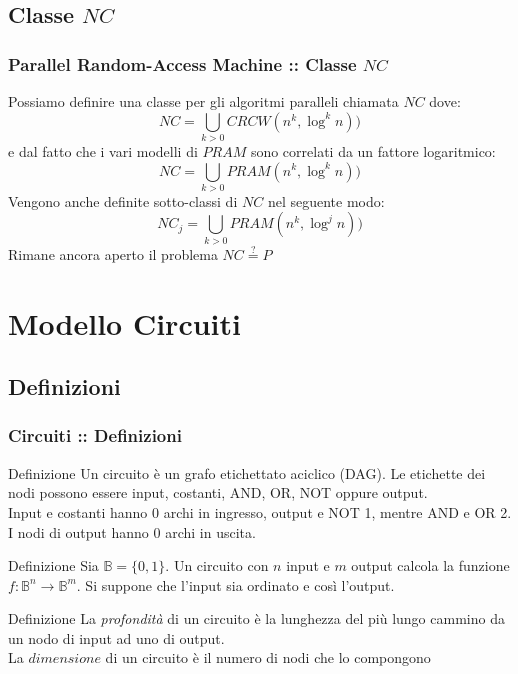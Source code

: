 \documentclass{beamer}
\begin{document}
\subsection{Classe $NC$}
\begin{frame}
	\frametitle{Parallel Random-Access Machine :: Classe $NC$} %
	Possiamo definire una classe per gli algoritmi paralleli chiamata $NC$ dove:
	\begin{equation}
		NC = \bigcup_{k>0} CRCW(n^k,\log^k n))
	\end{equation}
	e dal fatto che i vari modelli di $PRAM$ sono correlati da un fattore logaritmico: 
	\begin{equation}
		NC = \bigcup_{k>0} PRAM(n^k,\log^k n))
	\end{equation}
	Vengono anche definite sotto-classi di $NC$ nel seguente modo:
	\begin{equation}
		NC_j = \bigcup_{k>0} PRAM(n^k,\log^j n))
	\end{equation}
	Rimane ancora aperto il problema $NC \stackrel{?}{=} P$
	
\end{frame}





\section{Modello Circuiti}
\subsection{Definizioni}
\begin{frame}
	\frametitle{Circuiti :: Definizioni} %
	
	\begin{block}{Definizione}
		Un circuito è un grafo etichettato aciclico (DAG). Le etichette dei nodi possono essere input, costanti, AND, OR, NOT oppure output.\\ 
		Input e costanti hanno 0 archi in ingresso, output e NOT 1, mentre AND e OR 2. I nodi di output hanno 0 archi in uscita.
	\end{block}
	\begin{block}{Definizione}
		Sia $\mathbb{B} = \{0,1\}$. Un circuito con $n$ input e $m$ output calcola la funzione $f\colon \mathbb{B}^n\to\mathbb{B}^m$. Si suppone che l'input sia ordinato e così l'output.
	\end{block}
	\begin{block}{Definizione}
		La \emph{profondità} di un circuito è la lunghezza del più lungo cammino da un nodo di input ad uno di output.\\
		La $dimensione$ di un circuito è il numero di nodi che lo compongono 
	\end{block}
	
\end{frame}
\end{document}

